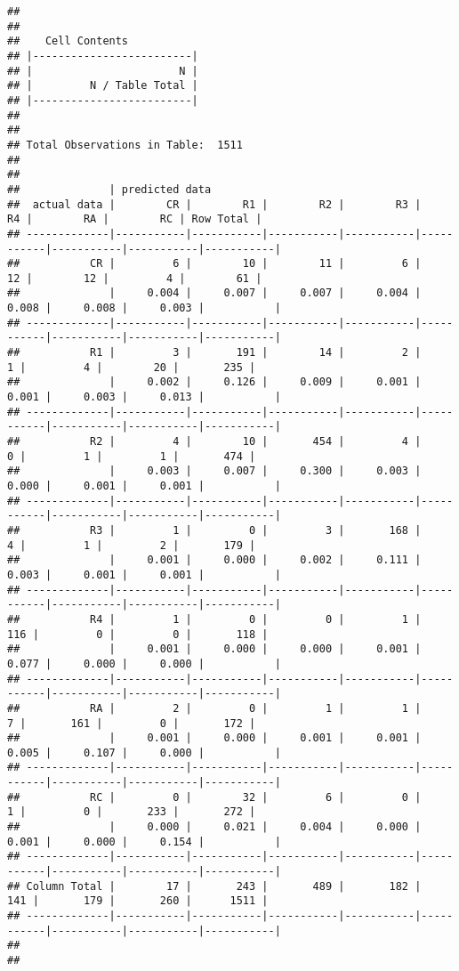 \documentclass[
]{article}
\begin{document}
\begin{verbatim}
## 
##  
##    Cell Contents
## |-------------------------|
## |                       N |
## |         N / Table Total |
## |-------------------------|
## 
##  
## Total Observations in Table:  1511 
## 
##  
##              | predicted data 
##  actual data |        CR |        R1 |        R2 |        R3 |        R4 |        RA |        RC | Row Total | 
## -------------|-----------|-----------|-----------|-----------|-----------|-----------|-----------|-----------|
##           CR |         6 |        10 |        11 |         6 |        12 |        12 |         4 |        61 | 
##              |     0.004 |     0.007 |     0.007 |     0.004 |     0.008 |     0.008 |     0.003 |           | 
## -------------|-----------|-----------|-----------|-----------|-----------|-----------|-----------|-----------|
##           R1 |         3 |       191 |        14 |         2 |         1 |         4 |        20 |       235 | 
##              |     0.002 |     0.126 |     0.009 |     0.001 |     0.001 |     0.003 |     0.013 |           | 
## -------------|-----------|-----------|-----------|-----------|-----------|-----------|-----------|-----------|
##           R2 |         4 |        10 |       454 |         4 |         0 |         1 |         1 |       474 | 
##              |     0.003 |     0.007 |     0.300 |     0.003 |     0.000 |     0.001 |     0.001 |           | 
## -------------|-----------|-----------|-----------|-----------|-----------|-----------|-----------|-----------|
##           R3 |         1 |         0 |         3 |       168 |         4 |         1 |         2 |       179 | 
##              |     0.001 |     0.000 |     0.002 |     0.111 |     0.003 |     0.001 |     0.001 |           | 
## -------------|-----------|-----------|-----------|-----------|-----------|-----------|-----------|-----------|
##           R4 |         1 |         0 |         0 |         1 |       116 |         0 |         0 |       118 | 
##              |     0.001 |     0.000 |     0.000 |     0.001 |     0.077 |     0.000 |     0.000 |           | 
## -------------|-----------|-----------|-----------|-----------|-----------|-----------|-----------|-----------|
##           RA |         2 |         0 |         1 |         1 |         7 |       161 |         0 |       172 | 
##              |     0.001 |     0.000 |     0.001 |     0.001 |     0.005 |     0.107 |     0.000 |           | 
## -------------|-----------|-----------|-----------|-----------|-----------|-----------|-----------|-----------|
##           RC |         0 |        32 |         6 |         0 |         1 |         0 |       233 |       272 | 
##              |     0.000 |     0.021 |     0.004 |     0.000 |     0.001 |     0.000 |     0.154 |           | 
## -------------|-----------|-----------|-----------|-----------|-----------|-----------|-----------|-----------|
## Column Total |        17 |       243 |       489 |       182 |       141 |       179 |       260 |      1511 | 
## -------------|-----------|-----------|-----------|-----------|-----------|-----------|-----------|-----------|
## 
## 
\end{verbatim}
\end{document}
